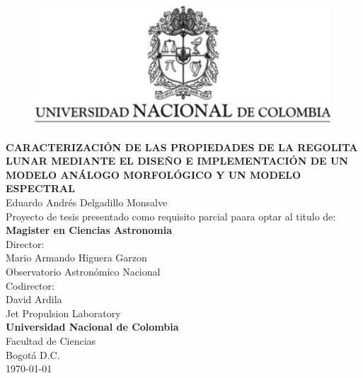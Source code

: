 \documentclass[12pt]{article}
\begin{document}
\newpage
\begin{titlepage}
    \thispagestyle{empty}
    \begin{center}
        \begin{figure}
        \centering%
        \includegraphics{images/EscudoUN.png}
    \end{figure}
    
    \vspace{1cm}
    
        \textbf{CARACTERIZACIÓN DE LAS PROPIEDADES DE LA REGOLITA LUNAR MEDIANTE EL DISEÑO E IMPLEMENTACIÓN DE UN MODELO ANÁLOGO MORFOLÓGICO Y UN MODELO ESPECTRAL}\\[1in]    
    Eduardo Andrés Delgadillo Monsalve \\  [1.5 cm]
 Proyecto de tesis presentado como requisito parcial paara optar al titulo de:\\[3mm] \textbf {\large{Magister en Ciencias Astronomia}}\\[1cm]
 Director:\\[3mm] Mario Armando Higuera Garzon\\[1mm] Observatorio Astronómico Nacional\\[1cm]
 Codirector:\\[3mm] David Ardila\\ Jet Propulsion Laboratory\\[1in]
 \textbf{Universidad Nacional de Colombia  }\\
   Facultad de Ciencias\\
   Bogotá D.C.\\
   \today
    \end{center}
\end{titlepage}

\newpage
\thispagestyle{empty}
\tableofcontents
\thispagestyle{empty}
\newpage



\newpage

\setcounter{page}{1}
\end{document}
